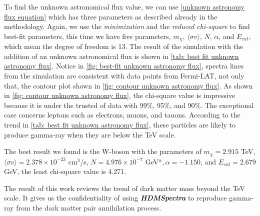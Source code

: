 \documentclass[10pt, oneside]{book}
\numberwithin{equation}{chapter}
\begin{document}
To find the unknown astronomical flux value, we can use \autoref{unknown astronomy flux equation} which has three parameters as described already in the methodology. Again, we use the \textit{minimization} and the \textit{reduced chi-square} to find best-fit parameters, this time we have five parameters, $m_\chi$, $\langle \sigma v \rangle$, $N$, $\alpha$, and $E_{cut}$, which mean the degree of freedom is 13. The result of the simulation with the addition of an unknown astronomical flux is shown in \autoref{tab: best fit unknown astronomy flux}. Notice in \autoref{fig: best-fit unknown astronomy flux}, spectra lines from the simulation are consistent with data points from Fermi-LAT, not only that, the contour plot shown in \autoref{fig: contour unknown astronomy flux}. As shown in \autoref{fig: contour unknown astronomy flux}, the chi-square value is impressive because it is under the trusted of data with 99\%, 95\%, and 90\%. The exceptional case concerns leptons such as electrons, muons, and tauons. According to the trend in \autoref{tab: best fit unknown astronomy flux}, these particles are likely to produce gamma-ray when they are below the TeV scale.

The best result we found is the W-boson with the parameters of $m_\chi=2.915$ TeV, $\langle \sigma v \rangle=2.378\times 10^{-23}$ cm$^3$/s, $N=4.976\times 10^{-7}$ GeV$^\alpha, \alpha=-1.150$, and $E_{cut}=2.679$ GeV, the least chi-square value is 4.271.

The result of this work reviews the trend of dark matter mass beyond the TeV scale. It gives us the confidentiality of using \textbf{\textit{HDMSpectra}} to reproduce gamma-ray from the dark matter pair annihilation process.




\newpage

\appendix
\end{document}
